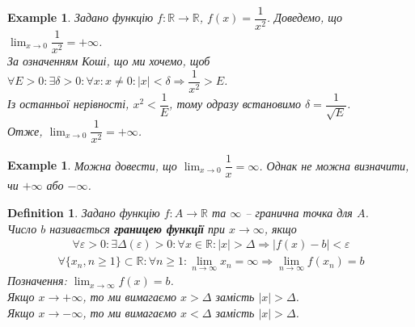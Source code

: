 \documentclass[a4paper, 14pt]{article}
\theoremstyle{theoremdd}
\theoremstyle{theoremdd}
\newtheorem{definition}[theorem]{Definition}
\theoremstyle{theoremdd}
\theoremstyle{theoremdd}
\newtheorem{example}[theorem]{Example}
\theoremstyle{theoremdd}
\theoremstyle{theoremdd}
\theoremstyle{theoremdd}
\theoremstyle{theoremdd}
\begin{document}
	\begin{example}
	Задано функцію $f \colon \mathbb{R} \to \mathbb{R}$, $f(x) = \dfrac{1}{x^2}$. Доведемо, що $\displaystyle\lim_{x \to 0} \dfrac{1}{x^2} = +\infty$.\\
	За означенням Коші, що ми хочемо, щоб $\forall E > 0: \exists \delta > 0: \forall x: x \neq 0: |x|<\delta \Rightarrow \dfrac{1}{x^2} > E$.\\
	Із останньої нерівності, $x^2 < \dfrac{1}{E}$, тому одразу встановимо $\delta = \dfrac{1}{\sqrt{E}}$.\\
	Отже, $\displaystyle\lim_{x \to 0} \dfrac{1}{x^2} = +\infty$.
\\ %
	\end{example}
	
	\begin{example}
	Можна довести, що $\displaystyle\lim_{x \to 0} \dfrac{1}{x} = \infty$. Однак не можна визначити, чи $+\infty$ або $-\infty$.
	\end{example}
	
	\begin{definition}
	Задано функцію $f \colon A \to \mathbb{R}$ та $\infty$ -- гранична точка для $A$.\\
	Число $b$ називається \textbf{границею функції} при $x \to \infty$, якщо
	\begin{align*}
	\forall \varepsilon > 0: \exists \Delta(\varepsilon) > 0: \forall x \in \mathbb{R}: |x|>\Delta \Rightarrow |f(x)-b|<\varepsilon \tag*{означення Коші}
	\end{align*}
	\begin{align*}
	\forall \{x_n, n \geq 1\} \subset \mathbb{R}: \forall n \geq 1: \lim_{n \to \infty} x_n = \infty \Rightarrow \lim_{n \to \infty} f(x_n) = b \tag*{означення Гайне}
	\end{align*}
	Позначення: $\displaystyle \lim_{x \to \infty} f(x) = b$.\\
	Якщо $x \to +\infty$, то ми вимагаємо $x > \Delta$ замість $|x| > \Delta$.\\
	Якщо $x \to -\infty$, то ми вимагаємо $x < \Delta$ замість $|x| > \Delta$.
	\end{definition}
	
\end{document}
